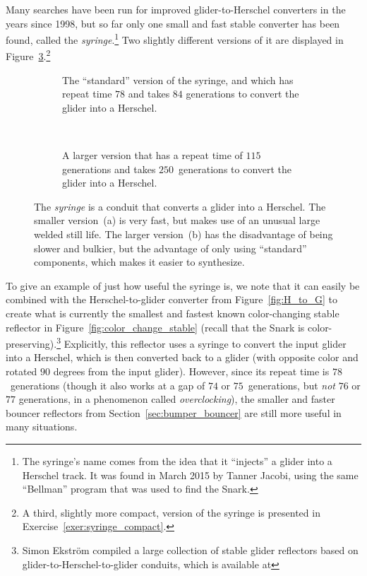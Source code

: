 Many searches have been run for improved glider-to-Herschel converters in the years since 1998, but so far only one small and fast stable converter has been found, called the \emph{syringe}.\footnote{The syringe's name comes from the idea that it ``injects'' a glider into a Herschel track. It was found in March 2015 by Tanner Jacobi, using the same ``Bellman'' program that was used to find the Snark.} Two slightly different versions of it are displayed in Figure~\ref{fig:syringe}.\footnote{A third, slightly more compact, version of the syringe is presented in Exercise~\ref{exer:syringe_compact}.}

\begin{figure}[!htb]
	\centering
	\begin{subfigure}{.3\textwidth}
		\centering{}
		\caption{The ``standard'' version of the syringe, and which has repeat time $78$ and takes $84$ generations to convert the glider into a Herschel.}\label{fig:syringe_main}
	\end{subfigure} \ \ \ \ %
	\begin{subfigure}{.66\textwidth}
		\centering{}
		\caption{A larger version that has a repeat time of $115$ generations and takes $250$~generations to convert the glider into a Herschel.}
		\label{fig:syringe_modified}
	\end{subfigure}
	\caption{The \emph{syringe} is a conduit that converts a glider into a Herschel. The smaller version~(a) is very fast, but makes use of an unusual large welded still life. The larger version~(b) has the disadvantage of being slower and bulkier, but the advantage of only using ``standard'' components, which makes it easier to synthesize.}\label{fig:syringe}
\end{figure}

To give an example of just how useful the syringe is, we note that it can easily be combined with the Herschel-to-glider converter from Figure~\ref{fig:H_to_G} to create what is currently the smallest and fastest known color-changing stable reflector in Figure~\ref{fig:color_change_stable} (recall that the Snark is color-preserving).\footnote{Simon Ekström compiled a large collection of stable glider reflectors based on glider-to-Herschel-to-glider conduits, which is available at } Explicitly, this reflector uses a syringe to convert the input glider into a Herschel, which is then converted back to a glider (with opposite color and rotated $90$ degrees from the input glider). However, since its repeat time is $78$~generations (though it also works at a gap of $74$ or $75$~generations, but \emph{not} $76$ or $77$ generations, in a phenomenon called \emph{overclocking}), the smaller and faster bouncer reflectors from Section~\ref{sec:bumper_bouncer} are still more useful in many situations.

